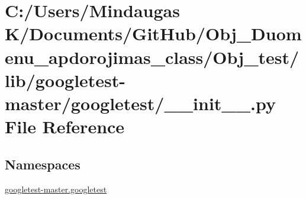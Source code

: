 \hypertarget{_obj__test_2lib_2googletest-master_2googletest_2____init_____8py}{}\section{C\+:/\+Users/\+Mindaugas K/\+Documents/\+Git\+Hub/\+Obj\+\_\+\+Duomenu\+\_\+apdorojimas\+\_\+class/\+Obj\+\_\+test/lib/googletest-\/master/googletest/\+\_\+\+\_\+init\+\_\+\+\_\+.py File Reference}
\label{_obj__test_2lib_2googletest-master_2googletest_2____init_____8py}
\subsection*{Namespaces}
\begin{DoxyCompactItemize}
\item 
 \mbox{\hyperlink{namespacegoogletest-master_1_1googletest}{googletest-\/master.\+googletest}}
\end{DoxyCompactItemize}
